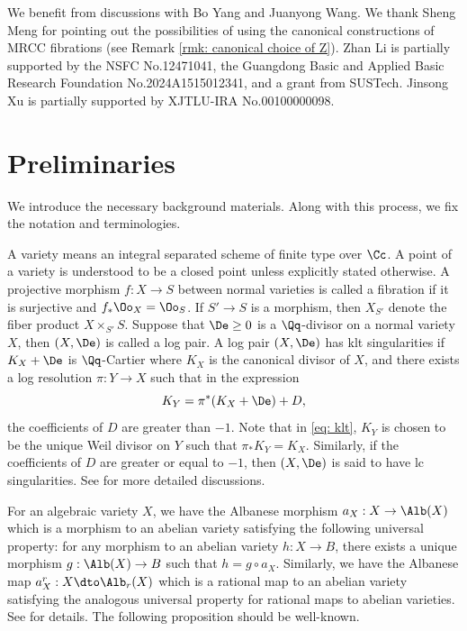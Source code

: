 \documentclass[11pt]{amsart}
\begin{document}
\medskip

 We benefit from discussions with Bo Yang and Juanyong Wang. We thank Sheng Meng for pointing out the possibilities of using the canonical constructions of MRCC fibrations (see Remark \ref{rmk: canonical choice of Z}). Zhan Li is partially supported by the NSFC No.12471041, the Guangdong Basic and Applied Basic Research Foundation No.2024A1515012341, and a grant from SUSTech. Jinsong Xu is partially supported by XJTLU-IRA No.00100000098.

\section{Preliminaries}\label{sec: pre}

We introduce the necessary background materials. Along with this process, we fix the notation and terminologies. 

A variety means an integral separated scheme of finite type over $\Cc$. A point of a variety is understood to be a closed point unless explicitly stated otherwise. A projective morphism $f: X \to S$ between normal varieties is called a fibration if it is surjective and $f_*\Oo_X=\Oo_S$. If $S' \to S$ is a morphism, then $X_{S'}$ denote the fiber product $X \times_{S'}S$. Suppose that $\De \geq 0$ is a $\Qq$-divisor on a normal variety $X$, then $(X,\De)$ is called a log pair. A log pair $(X,\De)$ has klt singularities if $K_X+\De$ is $\Qq$-Cartier where $K_X$ is the canonical divisor of $X$, and there exists a log resolution $\pi: Y \to X$ such that in the expression
\begin{equation}\label{eq: klt}
    K_Y=\pi^*(K_X+\De)+D,
\end{equation}
the coefficients of $D$ are greater than $-1$. Note that in \eqref{eq: klt}, $K_Y$ is chosen to be the unique Weil divisor on $Y$ such that $\pi_*K_Y=K_X$. Similarly, if the coefficients of $D$ are greater or equal to $-1$, then $(X,\De)$ is said to have lc singularities. See \cite[\S 2.3]{KM98} for more detailed discussions. 

For an algebraic variety $X$, we have the Albanese morphism $a_X: X \to \Alb(X)$ which is a morphism to an abelian variety satisfying the following universal property: for any morphism to an abelian variety $h: X \to B$, there exists a unique morphism $g: \Alb(X) \to B$ such that $h=g \circ a_X$. Similarly, we have the Albanese map $a^r_X: X \dto \Alb_r(X)$ which is a rational map to an abelian variety satisfying the analogous universal property for rational maps to abelian varieties. See \cite{Ser58} for details. The following proposition should be well-known.
\end{document}
